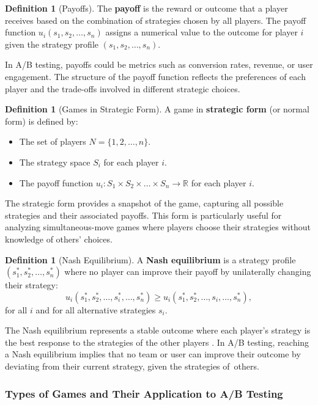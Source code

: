 \documentclass[magisterska, english]{pwr_wmat_praca_dyplomowa}
\theoremstyle{plain}
\numberwithin{theorem}{chapter}
\theoremstyle{definition}
\numberwithin{theorem}{chapter}
\newtheorem{definition}[theorem]{Definition}
\begin{document}
\begin{definition}[Payoffs]
	The \textbf{payoff} is the reward or outcome that a player receives based on the combination of strategies chosen by all players. The payoff function \( u_i(s_1, s_2, \dots, s_n) \) assigns a numerical value to the outcome for player \( i \) given the strategy profile \( (s_1, s_2, \dots, s_n) \). 
\end{definition}
\noindent
In A/B testing, payoffs could be metrics such as conversion rates, revenue, or user engagement. The structure of the payoff function reflects the preferences of each player and the trade-offs involved in different strategic choices.

\begin{definition}[Games in Strategic Form]
	A game in \textbf{strategic form} (or normal form) is defined by:
	\begin{itemize}
		\item The set of players \( N = \{1, 2, \dots, n\} \).
		\item The strategy space \( S_i \) for each player \( i \).
		\item The payoff function \( u_i: S_1 \times S_2 \times \dots \times S_n \rightarrow \mathbb{R} \) for each player \( i \).
	\end{itemize}
\end{definition}
\noindent
The strategic form provides a snapshot of the game, capturing all possible strategies and their associated payoffs. This form is particularly useful for analyzing simultaneous-move games where players choose their strategies without knowledge of others' choices.
\begin{definition}[Nash Equilibrium]
	A \textbf{Nash equilibrium} is a strategy profile\\\( (s_1^*, s_2^*, \dots, s_n^*) \) where no player can improve their payoff by unilaterally changing their strategy:
	\[
	u_i(s_1^*, s_2^*, \dots, s_i^*, \dots, s_n^*) \geq u_i(s_1^*, s_2^*, \dots, s_i, \dots, s_n^*),
	\]
	for all \( i \) and for all alternative strategies \( s_i \).
\end{definition}
\noindent
The Nash equilibrium represents a stable outcome where each player’s strategy is the best response to the strategies of the other players \cite{nash1950non}. In A/B testing, reaching a Nash equilibrium implies that no team or user can improve their outcome by deviating from their current strategy, given the strategies of~others.

\subsubsection{Types of Games and Their Application to A/B Testing}
\end{document}
